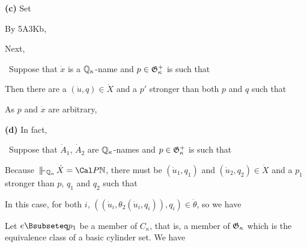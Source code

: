 {\medskip

{\bf (c)} Set


\noindent By 5A3Kb,


\noindent Next,


\noindent\Prf\ Suppose that $\dot x$ is a $\Bbb Q_{\kappa}$-name and $p\in\frak G_{\kappa}^+$ is
such that


\noindent Then there are a $(\dot u,q)\in\dot X$ and a $p'$ stronger than
both $p$ and $q$ such that


\noindent As $p$ and $\dot x$ are arbitrary,


\medskip

{\bf (d)} In fact,


\noindent\Prf\ Suppose that $\dot A_1$, $\dot A_2$ are $\Bbb Q_{\kappa}$-names and
$p\in\frak G_{\kappa}^+$ is such that


\noindent Because $\VVdQk\,\dot X=\Cal P\Bbb N$, there must be
$(\dot u_1,q_1)$ and $(\dot u_2,q_2)\in\dot X$ and a $p_1$
stronger than $p$, $q_1$ and $q_2$ such that


\noindent In this case, for both $i$,
$((\dot u_i,\theta_2(\dot u_i,q_i)),q_i)\in\dot\theta$,
so we have


\noindent Let $e\Bsubseteq p_1$ be a member of $C_{\kappa}$, that
is, a member of $\frak G_{\kappa}$ which is the equivalence class of a
basic cylinder set.   We have

}
